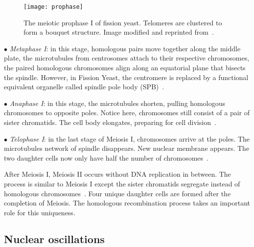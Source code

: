 \begin{figure}[htpb]
    \centering
    \texttt{[image: prophase]}
    \caption{The meiotic prophase I of fission yeast. Telomeres are clustered to form a bouquet structure. Image modified and reprinted from~\cite{Asakawa2007}.}
    \label{fig:prophase}
\end{figure}

$\bullet$ \emph{Metaphase I}: in this stage, homologous pairs move together along the middle plate, the microtubules from centrosomes attach to their respective chromosomes, the paired homologous chromosomes align along an equatorial plane that bisects the spindle. However, in Fission Yeast, the centromere is replaced by a functional equivalent organelle called spindle pole body (SPB)~\cite{Freeman2008}.

$\bullet$ \emph{Anaphase I}: in this stage, the microtubules shorten, pulling homologous chromosomes to opposite poles. Notice here, chromosomes still consist of a pair of sister chromatids. The cell body elongates, preparing for cell division~\cite{Freeman2008}.

$\bullet$ \emph{Telophase I}: in the last stage of Meiosis I, chromosomes arrive at the poles. The microtubules network of spindle disappears. New nuclear membrane appears. The two daughter cells now only have half the number of chromosomes~\cite{Freeman2008}.

After Meiosis I, Meiosis II occurs without DNA replication in between. The process is similar to Meiosis I except the sister chromatids segregate instead of homologous chromosomes~\cite{Freeman2008}. Four unique daughter cells are formed after the completion of Meiosis. The homologous recombination process takes an important role for this uniqueness.

\subsection{Nuclear oscillations}
\label{sub:nuclear_oscillations}

